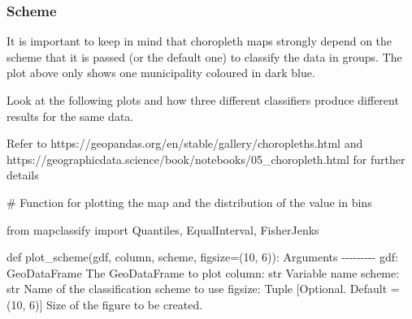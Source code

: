 \documentclass[
  letterpaper,
  DIV=11,
  numbers=noendperiod]{scrreprt}
\newenvironment{Shaded}{\begin{snugshade}}{\end{snugshade}}
\newcommand{\CommentTok}[1]{\textcolor[rgb]{0.37,0.37,0.37}{#1}}
\newcommand{\DecValTok}[1]{\textcolor[rgb]{0.68,0.00,0.00}{#1}}
\newcommand{\ImportTok}[1]{\textcolor[rgb]{0.00,0.46,0.62}{#1}}
\newcommand{\KeywordTok}[1]{\textcolor[rgb]{0.00,0.23,0.31}{#1}}
\newcommand{\NormalTok}[1]{\textcolor[rgb]{0.00,0.23,0.31}{#1}}
\newcommand{\OperatorTok}[1]{\textcolor[rgb]{0.37,0.37,0.37}{#1}}
\begin{document}
\subsubsection{Scheme}\label{scheme}

It is important to keep in mind that choropleth maps strongly depend on
the scheme that it is passed (or the default one) to classify the data
in groups. The plot above only shows one municipality coloured in dark
blue.

Look at the following plots and how three different classifiers produce
different results for the same data.

Refer to https://geopandas.org/en/stable/gallery/choropleths.html and
https://geographicdata.science/book/notebooks/05\_choropleth.html for
further details

\begin{Shaded}
\begin{Highlighting}[]
\CommentTok{\# Function for plotting the map and the distribution of the value in bins  }

\ImportTok{from}\NormalTok{ mapclassify }\ImportTok{import}\NormalTok{ Quantiles, EqualInterval, FisherJenks}

\KeywordTok{def}\NormalTok{ plot\_scheme(gdf, column, scheme, figsize}\OperatorTok{=}\NormalTok{(}\DecValTok{10}\NormalTok{, }\DecValTok{6}\NormalTok{)):}
    \CommentTok{\textquotesingle{}\textquotesingle{}\textquotesingle{}}
\CommentTok{    Arguments}
\CommentTok{    {-}{-}{-}{-}{-}{-}{-}{-}{-}}
\CommentTok{    gdf: GeoDataFrame}
\CommentTok{        The GeoDataFrame to plot}
\CommentTok{    column: str}
\CommentTok{        Variable name }
\CommentTok{    scheme: str}
\CommentTok{        Name of the classification scheme to use }
\CommentTok{    figsize: Tuple}
\CommentTok{        [Optional. Default = (10, 6)] Size of the figure to be created.}


\end{Highlighting}
\end{Shaded}
\end{document}
